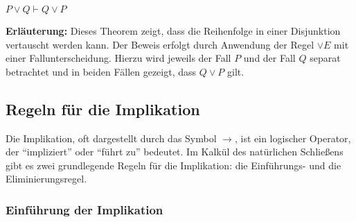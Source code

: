 \documentclass[main.tex]{subfiles}
\begin{document}
\begin{lemma}
\( P \lor Q \vdash Q \lor P \)
\end{lemma}

\textbf{Erläuterung:} Dieses Theorem zeigt, dass die Reihenfolge in einer Disjunktion vertauscht werden kann. Der Beweis erfolgt durch Anwendung der Regel \(\lor E\) mit einer Fallunterscheidung. Hierzu wird jeweils der Fall \(P\) und der Fall \(Q\) separat betrachtet und in beiden Fällen gezeigt, dass \(Q \lor P\) gilt.

\begin{tabproof}
\end{tabproof}

\subsection{Regeln für die Implikation}

Die Implikation, oft dargestellt durch das Symbol \(\rightarrow\), ist ein logischer Operator, der \enquote{impliziert} oder \enquote{führt zu} bedeutet. Im Kalkül des natürlichen Schließens gibt es zwei grundlegende Regeln für die Implikation: die Einführungs- und die Eliminierungsregel.

\subsubsection{Einführung der Implikation}
\label{rule:RI}
\end{document}
